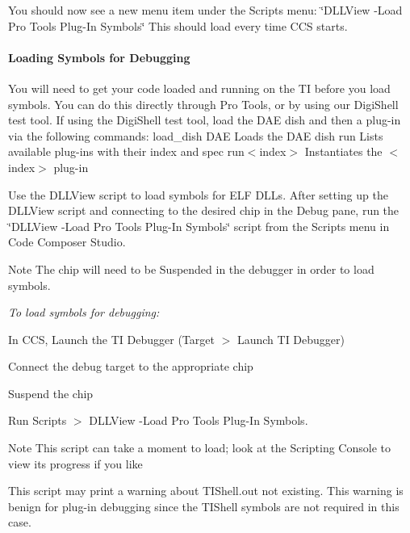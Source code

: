 You should now see a new menu item under the Scripts menu\+: \char`\"{}\+D\+L\+L\+View -\/\+Load Pro Tools Plug-\/\+In Symbols\char`\"{} This should load every time C\+CS starts.

\hypertarget{a00832_subsubsection__loading_symbols_for_debugging_}{}\paragraph{Loading Symbols for Debugging}\label{a00832_subsubsection__loading_symbols_for_debugging_}
 You will need to get your code loaded and running on the TI before you load symbols. You can do this directly through Pro Tools, or by using our Digi\+Shell test tool. If using the Digi\+Shell test tool, load the D\+AE dish and then a plug-\/in via the following commands\+:  {\ttfamily load\+\_\+dish D\+AE}   Loads the D\+AE dish  {\ttfamily run }  Lists available plug-\/ins with their index and spec  {\ttfamily run$<$index$>$}   Instantiates the $<$index$>$ plug-\/in

Use the D\+L\+L\+View script to load symbols for E\+LF D\+L\+Ls. After setting up the D\+L\+L\+View script and connecting to the desired chip in the Debug pane, run the \char`\"{}\+D\+L\+L\+View -\/\+Load Pro Tools Plug-\/\+In Symbols\char`\"{} script from the Scripts menu in Code Composer Studio.

\begin{DoxyNote}{Note}
The chip will need to be Suspended in the debugger in order to load symbols.
\end{DoxyNote}
{\itshape  To load symbols for debugging\+:} 
\begin{DoxyEnumerate}
\item In C\+CS, Launch the TI Debugger (Target $>$ Launch TI Debugger)  
\item Connect the debug target to the appropriate chip 
\item Suspend the chip  
\item Run Scripts $>$ D\+L\+L\+View -\/Load Pro Tools Plug-\/\+In Symbols. \begin{DoxyNote}{Note}
This script can take a moment to load; look at the Scripting Console to view its progress if you like 

This script may print a warning about T\+I\+Shell.\+out not existing. This warning is benign for plug-\/in debugging since the T\+I\+Shell symbols are not required in this case.  
\end{DoxyNote}

\end{DoxyEnumerate}

